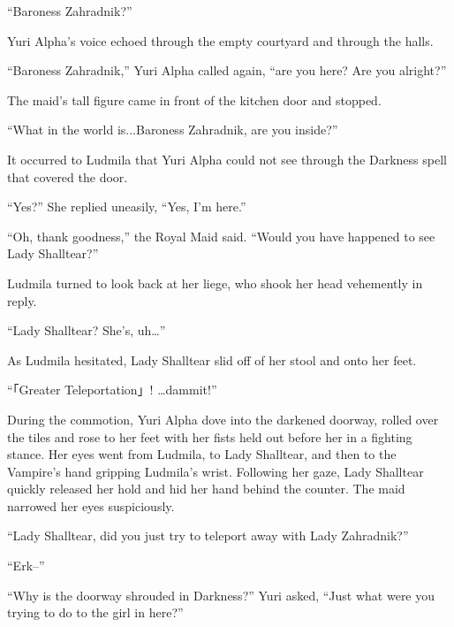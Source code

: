  

“Baroness Zahradnik?”

 

Yuri Alpha’s voice echoed through the empty courtyard and through the halls.

 

“Baroness Zahradnik,” Yuri Alpha called again, “are you here? Are you alright?”

 

The maid’s tall figure came in front of the kitchen door and stopped.

 

“What in the world is...Baroness Zahradnik, are you inside?”

 

It occurred to Ludmila that Yuri Alpha could not see through the Darkness spell that covered the door.

 

“Yes?” She replied uneasily, “Yes, I’m here.”

 

“Oh, thank goodness,” the Royal Maid said. “Would you have happened to see Lady Shalltear?”

 

Ludmila turned to look back at her liege, who shook her head vehemently in reply.

 

“Lady Shalltear? She’s, uh…”

 

As Ludmila hesitated, Lady Shalltear slid off of her stool and onto her feet.

 

“「Greater Teleportation」! …dammit!”

 

During the commotion, Yuri Alpha dove into the darkened doorway, rolled over the tiles and rose to her feet with her fists held out before her in a fighting stance. Her eyes went from Ludmila, to Lady Shalltear, and then to the Vampire’s hand gripping Ludmila’s wrist. Following her gaze, Lady Shalltear quickly released her hold and hid her hand behind the counter. The maid narrowed her eyes suspiciously.

 

“Lady Shalltear, did you just try to teleport away with Lady Zahradnik?”

 

“Erk–”

 

“Why is the doorway shrouded in Darkness?” Yuri asked, “Just what were you trying to do to the girl in here?”

